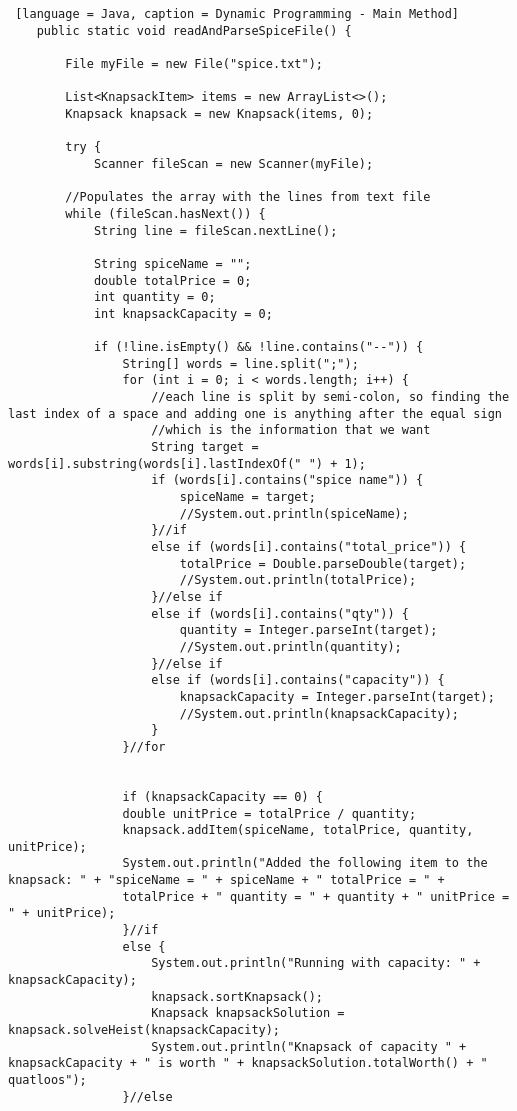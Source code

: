 \documentclass{article}
\begin{document}
\begin{lstlisting} [language = Java, caption = Dynamic Programming - Main Method]
    public static void readAndParseSpiceFile() {

        File myFile = new File("spice.txt");

        List<KnapsackItem> items = new ArrayList<>();
        Knapsack knapsack = new Knapsack(items, 0);

        try {
            Scanner fileScan = new Scanner(myFile);

        //Populates the array with the lines from text file
        while (fileScan.hasNext()) {
            String line = fileScan.nextLine();
            
            String spiceName = "";
            double totalPrice = 0;
            int quantity = 0;
            int knapsackCapacity = 0;

            if (!line.isEmpty() && !line.contains("--")) {
                String[] words = line.split(";");
                for (int i = 0; i < words.length; i++) {
                    //each line is split by semi-colon, so finding the last index of a space and adding one is anything after the equal sign
                    //which is the information that we want
                    String target = words[i].substring(words[i].lastIndexOf(" ") + 1);
                    if (words[i].contains("spice name")) {
                        spiceName = target;
                        //System.out.println(spiceName);
                    }//if
                    else if (words[i].contains("total_price")) {
                        totalPrice = Double.parseDouble(target);
                        //System.out.println(totalPrice);
                    }//else if
                    else if (words[i].contains("qty")) {
                        quantity = Integer.parseInt(target);
                        //System.out.println(quantity);
                    }//else if
                    else if (words[i].contains("capacity")) {
                        knapsackCapacity = Integer.parseInt(target);
                        //System.out.println(knapsackCapacity);
                    }
                }//for

                
                if (knapsackCapacity == 0) {
                double unitPrice = totalPrice / quantity;
                knapsack.addItem(spiceName, totalPrice, quantity, unitPrice);
                System.out.println("Added the following item to the knapsack: " + "spiceName = " + spiceName + " totalPrice = " + 
                totalPrice + " quantity = " + quantity + " unitPrice = " + unitPrice);
                }//if
                else {
                    System.out.println("Running with capacity: " + knapsackCapacity);
                    knapsack.sortKnapsack();
                    Knapsack knapsackSolution = knapsack.solveHeist(knapsackCapacity);
                    System.out.println("Knapsack of capacity " + knapsackCapacity + " is worth " + knapsackSolution.totalWorth() + " quatloos");
                }//else


\end{lstlisting}
\end{document}
